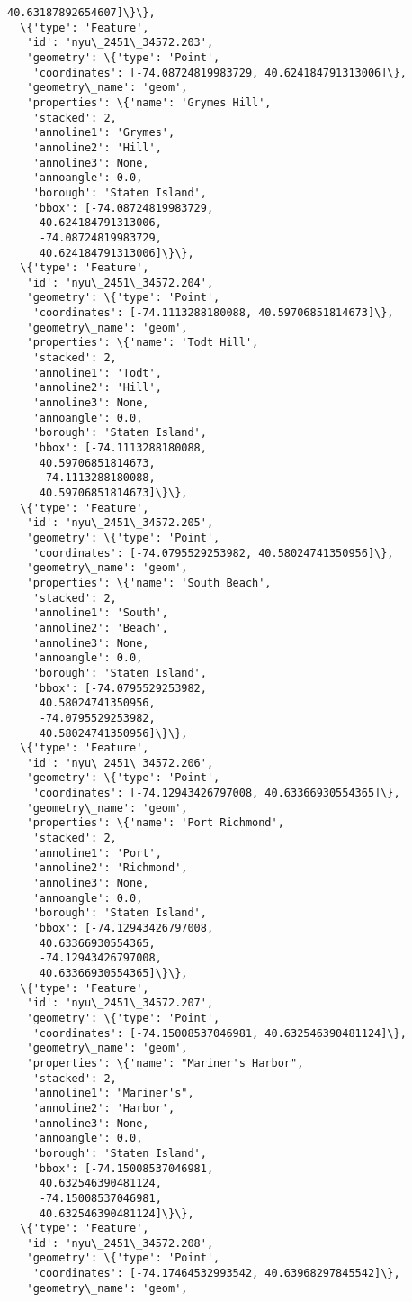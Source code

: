 \documentclass[11pt]{article}
\begin{document}
\begin{tcolorbox}[breakable, size=fbox, boxrule=.5pt, pad at break*=1mm, opacityfill=0]
\begin{Verbatim}[commandchars=\\\{\}]
     40.63187892654607]\}\},
  \{'type': 'Feature',
   'id': 'nyu\_2451\_34572.203',
   'geometry': \{'type': 'Point',
    'coordinates': [-74.08724819983729, 40.624184791313006]\},
   'geometry\_name': 'geom',
   'properties': \{'name': 'Grymes Hill',
    'stacked': 2,
    'annoline1': 'Grymes',
    'annoline2': 'Hill',
    'annoline3': None,
    'annoangle': 0.0,
    'borough': 'Staten Island',
    'bbox': [-74.08724819983729,
     40.624184791313006,
     -74.08724819983729,
     40.624184791313006]\}\},
  \{'type': 'Feature',
   'id': 'nyu\_2451\_34572.204',
   'geometry': \{'type': 'Point',
    'coordinates': [-74.1113288180088, 40.59706851814673]\},
   'geometry\_name': 'geom',
   'properties': \{'name': 'Todt Hill',
    'stacked': 2,
    'annoline1': 'Todt',
    'annoline2': 'Hill',
    'annoline3': None,
    'annoangle': 0.0,
    'borough': 'Staten Island',
    'bbox': [-74.1113288180088,
     40.59706851814673,
     -74.1113288180088,
     40.59706851814673]\}\},
  \{'type': 'Feature',
   'id': 'nyu\_2451\_34572.205',
   'geometry': \{'type': 'Point',
    'coordinates': [-74.0795529253982, 40.58024741350956]\},
   'geometry\_name': 'geom',
   'properties': \{'name': 'South Beach',
    'stacked': 2,
    'annoline1': 'South',
    'annoline2': 'Beach',
    'annoline3': None,
    'annoangle': 0.0,
    'borough': 'Staten Island',
    'bbox': [-74.0795529253982,
     40.58024741350956,
     -74.0795529253982,
     40.58024741350956]\}\},
  \{'type': 'Feature',
   'id': 'nyu\_2451\_34572.206',
   'geometry': \{'type': 'Point',
    'coordinates': [-74.12943426797008, 40.63366930554365]\},
   'geometry\_name': 'geom',
   'properties': \{'name': 'Port Richmond',
    'stacked': 2,
    'annoline1': 'Port',
    'annoline2': 'Richmond',
    'annoline3': None,
    'annoangle': 0.0,
    'borough': 'Staten Island',
    'bbox': [-74.12943426797008,
     40.63366930554365,
     -74.12943426797008,
     40.63366930554365]\}\},
  \{'type': 'Feature',
   'id': 'nyu\_2451\_34572.207',
   'geometry': \{'type': 'Point',
    'coordinates': [-74.15008537046981, 40.632546390481124]\},
   'geometry\_name': 'geom',
   'properties': \{'name': "Mariner's Harbor",
    'stacked': 2,
    'annoline1': "Mariner's",
    'annoline2': 'Harbor',
    'annoline3': None,
    'annoangle': 0.0,
    'borough': 'Staten Island',
    'bbox': [-74.15008537046981,
     40.632546390481124,
     -74.15008537046981,
     40.632546390481124]\}\},
  \{'type': 'Feature',
   'id': 'nyu\_2451\_34572.208',
   'geometry': \{'type': 'Point',
    'coordinates': [-74.17464532993542, 40.63968297845542]\},
   'geometry\_name': 'geom',

\end{Verbatim}
\end{tcolorbox}
\end{document}
